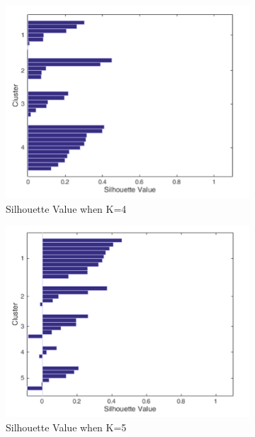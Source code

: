 \begin{figure}[!hbt]
\begin{subfigure}{0.45\textwidth}
        \includegraphics[width=\textwidth]{persona3c}
        \caption{Silhouette Value when K=4}
    \end{subfigure}\hspace{0.01\textwidth}
\begin{subfigure}{0.45\textwidth}
        \includegraphics[width=\textwidth]{persona3d}
        \caption{Silhouette Value when K=5}
    \end{subfigure}
 \begin{subfigure}{0.45\textwidth}

\end{subfigure}
\end{figure}
